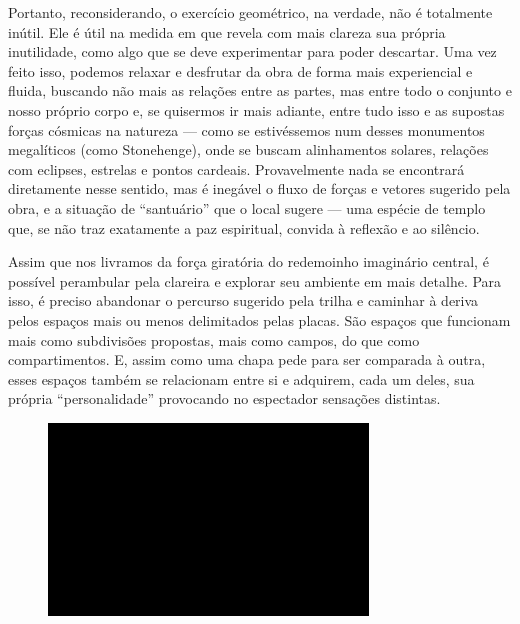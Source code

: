 Portanto, reconsiderando, o exercício geométrico, na verdade, não é
totalmente inútil. Ele é útil na medida em que revela com mais clareza
sua própria inutilidade, como algo que se deve experimentar para poder
descartar. Uma vez feito isso, podemos relaxar e desfrutar da obra de
forma mais experiencial e fluida, buscando não mais as relações entre as
partes, mas entre todo o conjunto e nosso próprio corpo e, se quisermos
ir mais adiante, entre tudo isso e as supostas forças cósmicas na
natureza --- como se estivéssemos num desses monumentos megalíticos (como
Stonehenge), onde se buscam alinhamentos solares, relações com eclipses,
estrelas e pontos cardeais. Provavelmente nada se encontrará diretamente
nesse sentido, mas é inegável o fluxo de forças e vetores sugerido pela
obra, e a situação de ``santuário'' que o local sugere --- uma espécie
de templo que, se não traz exatamente a paz espiritual, convida à
reflexão e ao silêncio.

Assim que nos livramos da força giratória do redemoinho imaginário
central, é possível perambular pela clareira e explorar seu ambiente em
mais detalhe. Para isso, é preciso abandonar o percurso sugerido pela
trilha e caminhar à deriva pelos espaços mais ou menos delimitados pelas
placas. São espaços que funcionam mais como subdivisões propostas, mais
como campos, do que como compartimentos. E, assim como uma chapa pede
para ser comparada à outra, esses espaços também se relacionam entre si
e adquirem, cada um deles, sua própria ``personalidade'' provocando no
espectador sensações distintas.

\begin{figure}[!ht]

\centering
 \includegraphics[width=85mm]{./imgs/im1.jpg}
\caption{\tiny{}}

\end{figure}


